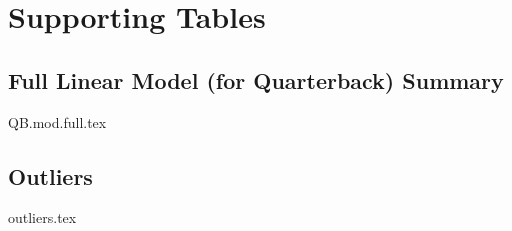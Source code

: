 \chapter{Supporting Tables}
\label{app:supportingTables}

\section{Full Linear Model (for Quarterback) Summary}
\label{tab:full_lm_QB}
{QB.mod.full.tex}

\clearpage
\begin{landscape}
	\section{Outliers}
	\label{tab:outliers}
	{outliers.tex}
\end{landscape}

